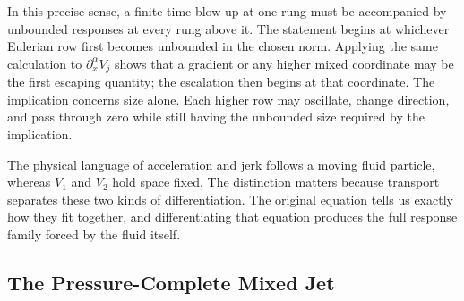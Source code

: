In this precise sense, a finite-time blow-up at one rung must be accompanied by unbounded responses at every rung above it.
The statement begins at whichever Eulerian row first becomes unbounded in the chosen norm.
Applying the same calculation to \(\partial_x^\alpha V_j\) shows that a gradient or any higher mixed coordinate may be the first escaping quantity; the escalation then begins at that coordinate.
The implication concerns size alone.
Each higher row may oscillate, change direction, and pass through zero while still having the unbounded size required by the implication.

The physical language of acceleration and jerk follows a moving fluid particle, whereas \(V_1\) and \(V_2\) hold space fixed.
The distinction matters because transport separates these two kinds of differentiation.
The original equation tells us exactly how they fit together, and differentiating that equation produces the full response family forced by the fluid itself.


\subsection{The Pressure-Complete Mixed Jet}\label{sub:ThePressureCompleteMixedJet}

